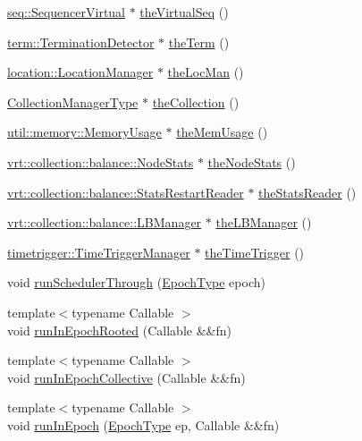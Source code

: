 \begin{DoxyCompactItemize}
\hyperlink{structvt_1_1seq_1_1_sequencer_virtual}{seq\+::\+Sequencer\+Virtual} $\ast$ \hyperlink{namespacevt_abdbb9ddb0d79b35c89e9d742d3fc9d42}{the\+Virtual\+Seq} ()
\item 
\hyperlink{structvt_1_1term_1_1_termination_detector}{term\+::\+Termination\+Detector} $\ast$ \hyperlink{namespacevt_a127580fdfcaba0b4171e5c48c5676733}{the\+Term} ()
\item 
\hyperlink{structvt_1_1location_1_1_location_manager}{location\+::\+Location\+Manager} $\ast$ \hyperlink{namespacevt_ace1c9d64e09732e3b7414d02517ecfdb}{the\+Loc\+Man} ()
\item 
\hyperlink{namespacevt_a290f7e8941f9f411b54cdb15b6cea107}{Collection\+Manager\+Type} $\ast$ \hyperlink{namespacevt_a1c45ce63bfd2c327ff7d76a319a371d8}{the\+Collection} ()
\item 
\hyperlink{structvt_1_1util_1_1memory_1_1_memory_usage}{util\+::memory\+::\+Memory\+Usage} $\ast$ \hyperlink{namespacevt_a38d485d3cf840b9a623e47e7754ef72e}{the\+Mem\+Usage} ()
\item 
\hyperlink{structvt_1_1vrt_1_1collection_1_1balance_1_1_node_stats}{vrt\+::collection\+::balance\+::\+Node\+Stats} $\ast$ \hyperlink{namespacevt_ae1526efa346612ad330d9a628e596c54}{the\+Node\+Stats} ()
\item 
\hyperlink{structvt_1_1vrt_1_1collection_1_1balance_1_1_stats_restart_reader}{vrt\+::collection\+::balance\+::\+Stats\+Restart\+Reader} $\ast$ \hyperlink{namespacevt_ad73860100c7d2ca1d833eab74942ee73}{the\+Stats\+Reader} ()
\item 
\hyperlink{structvt_1_1vrt_1_1collection_1_1balance_1_1_l_b_manager}{vrt\+::collection\+::balance\+::\+L\+B\+Manager} $\ast$ \hyperlink{namespacevt_a05187076eac8c66c9951b062b0955520}{the\+L\+B\+Manager} ()
\item 
\hyperlink{structvt_1_1timetrigger_1_1_time_trigger_manager}{timetrigger\+::\+Time\+Trigger\+Manager} $\ast$ \hyperlink{namespacevt_a1e1a39cdf2a3fc1adefcdfcca4716bf2}{the\+Time\+Trigger} ()
\item 
void \hyperlink{namespacevt_aa550774c1c9c668176ce535fd7d58fb0}{run\+Scheduler\+Through} (\hyperlink{namespacevt_a985a5adf291c34a3ca263b3378388236}{Epoch\+Type} epoch)
\item 
{\footnotesize template$<$typename Callable $>$ }\\void \hyperlink{namespacevt_a9f5cbbc484d7f14f2ad0ee46d62dfb6e}{run\+In\+Epoch\+Rooted} (Callable \&\&fn)
\item 
{\footnotesize template$<$typename Callable $>$ }\\void \hyperlink{namespacevt_a2fc4ef34f30b49a1781d765804bfadbb}{run\+In\+Epoch\+Collective} (Callable \&\&fn)
\item 
{\footnotesize template$<$typename Callable $>$ }\\void \hyperlink{namespacevt_ab95230c4145a8f4fb6874188eda37991}{run\+In\+Epoch} (\hyperlink{namespacevt_a985a5adf291c34a3ca263b3378388236}{Epoch\+Type} ep, Callable \&\&fn)
\end{DoxyCompactItemize}
